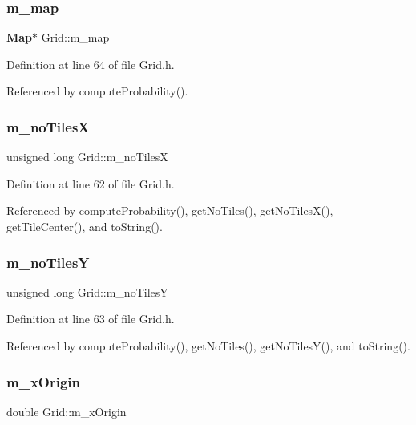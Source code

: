 \subsubsection{m\_map}
{\footnotesize\ttfamily \textbf{ Map}$\ast$ Grid\+::m\+\_\+map\hspace{0.3cm}{\ttfamily [private]}}



Definition at line 64 of file Grid.\+h.



Referenced by compute\+Probability().

\mbox{\label{class_grid_a177bfdc70436c25a1510d1abe19e34c1}} 
\subsubsection{m\_noTilesX}
{\footnotesize\ttfamily unsigned long Grid\+::m\+\_\+no\+TilesX\hspace{0.3cm}{\ttfamily [private]}}



Definition at line 62 of file Grid.\+h.



Referenced by compute\+Probability(), get\+No\+Tiles(), get\+No\+Tiles\+X(), get\+Tile\+Center(), and to\+String().

\mbox{\label{class_grid_a8fe14c4781dfd5623922fcc1f9c10130}} 
\subsubsection{m\_noTilesY}
{\footnotesize\ttfamily unsigned long Grid\+::m\+\_\+no\+TilesY\hspace{0.3cm}{\ttfamily [private]}}



Definition at line 63 of file Grid.\+h.



Referenced by compute\+Probability(), get\+No\+Tiles(), get\+No\+Tiles\+Y(), and to\+String().

\mbox{\label{class_grid_ae109d428ac5489815748e92fdde1b91f}} 
\subsubsection{m\_xOrigin}
{\footnotesize\ttfamily double Grid\+::m\+\_\+x\+Origin\hspace{0.3cm}{\ttfamily [private]}}



